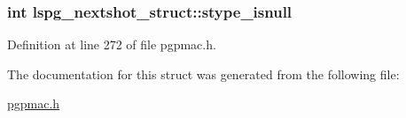 \hypertarget{structlspg__nextshot__struct_a79f48c452a4aca8506bae22f897c7441}{
\subsubsection[{stype\-\_\-isnull}]{\setlength{\rightskip}{0pt plus 5cm}int lspg\-\_\-nextshot\-\_\-struct\-::stype\-\_\-isnull}}\label{structlspg__nextshot__struct_a79f48c452a4aca8506bae22f897c7441}


Definition at line 272 of file pgpmac.\-h.



The documentation for this struct was generated from the following file\-:\begin{DoxyCompactItemize}
\item 
\hyperlink{pgpmac_8h}{pgpmac.\-h}\end{DoxyCompactItemize}

